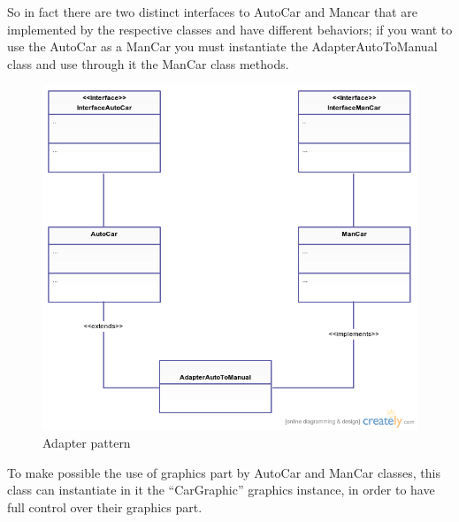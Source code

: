 \documentclass[a4paper,titlepage]{article}
\begin{document}
So in fact there are two distinct interfaces to AutoCar and Mancar that are implemented by the respective classes and have different behaviors; if you want to use the AutoCar as a ManCar you must instantiate the AdapterAutoToManual class and use through it the ManCar class methods.

\begin{figure}[!ht]
\centering
\includegraphics[scale=0.4]{adapter.png}
\caption{Adapter pattern}
\end{figure}


\newpage

To make possible the use of graphics part by AutoCar and ManCar classes, this class can instantiate in it the ``CarGraphic'' graphics instance, in order to have full control over their graphics part.
\end{document}

